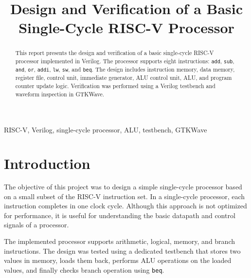 \documentclass[conference]{IEEEtran}
\begin{document}
\title{Design and Verification of a Basic Single-Cycle RISC-V Processor}

\author{
\and
{}
}

\maketitle

\begin{abstract}
This report presents the design and verification of a basic single-cycle RISC-V processor implemented in Verilog. The processor supports eight instructions: \texttt{add}, \texttt{sub}, \texttt{and}, \texttt{or}, \texttt{addi}, \texttt{lw}, \texttt{sw}, and \texttt{beq}. The design includes instruction memory, data memory, register file, control unit, immediate generator, ALU control unit, ALU, and program counter update logic. Verification was performed using a Verilog testbench and waveform inspection in GTKWave.
\end{abstract}

\begin{IEEEkeywords}
RISC-V, Verilog, single-cycle processor, ALU, testbench, GTKWave
\end{IEEEkeywords}

\section{Introduction}
The objective of this project was to design a simple single-cycle processor based on a small subset of the RISC-V instruction set. In a single-cycle processor, each instruction completes in one clock cycle. Although this approach is not optimized for performance, it is useful for understanding the basic datapath and control signals of a processor.

The implemented processor supports arithmetic, logical, memory, and branch instructions. The design was tested using a dedicated testbench that stores two values in memory, loads them back, performs ALU operations on the loaded values, and finally checks branch operation using \texttt{beq}.
\end{document}
